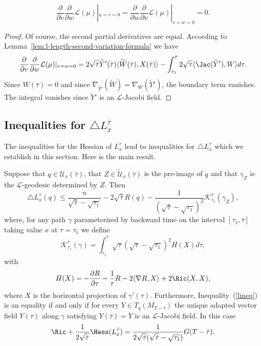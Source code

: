 \begin{claim}\label{claim:mixed-partials-vanish}
$$\frac{\partial}{\partial v}\frac{\partial}{\partial w}{\mathcal L}(\mu)|_{u=v=0}=
\frac{\partial}{\partial w}\frac{\partial}{\partial v}{\mathcal
L}(\mu)|_{v=w=0}=0.$$
\end{claim}
\begin{proof}
\sketch Of course, the second partial derivatives are equal. According to
Lemma~\ref{lem:l-length-second-variation-formula} we have
$$\frac{\partial}{\partial v}\frac{\partial}{\partial w}{\mathcal L}(\mu)|_{v=w=0}
=2\sqrt{\bar\tau} \widetilde Y'(\bar\tau)\langle \widetilde
W(\bar\tau),X(\bar\tau)\rangle-\int_{\tau_1}^{\bar\tau}2\sqrt{\tau}\langle
\Jac(\widetilde Y'),W\rangle d\tau.$$ Since $W(\bar\tau)=0$ and
since $\nabla_{\widetilde Y'}(\widetilde W)=\nabla_W(\widetilde
Y')$, the boundary term vanishes. The integral vanishes since
$\widetilde Y'$ is an ${\mathcal L}$-Jacobi field.
\end{proof}

\subsection{Inequalities for $\triangle L_x^{\bar\tau}$}

The inequalities for the Hessian of $L_x^{\bar\tau}$ lead to
inequalities for $\triangle L_x^{\bar\tau}$ which we establish in this section. Here is the
main result.


\begin{proposition}\label{prop:l-length-laplacian-inequality}
\label{triL}
Suppose that $q\in {\mathcal U}_x(\bar\tau)$, that $Z\in \widetilde
{\mathcal U}_x(\bar\tau)$ is the pre-image of $q$ and that
$\gamma_Z$ is the ${\mathcal L}$-geodesic determined by $Z$. Then
\begin{equation}\label{lineq}
 \triangle L_x^{\bar\tau}(q) \leq
\frac{n}{\sqrt{\bar\tau}-\sqrt{\tau_1}} -2\sqrt{\bar\tau}R(q) -
\frac{1}{(\sqrt{\bar\tau}-\sqrt{\tau_1})^2}{\mathcal
K}_{\tau_1}^{\bar\tau}(\gamma_Z),
\end{equation}
where, for any path $\gamma$ parameterized by backward time on the
interval
 $[\tau_1,\bar\tau]$ taking
 value $x$ at $\tau=\tau_1$ we define
$${\mathcal K}_{\tau_1}^{\bar\tau}(\gamma)= \int_{\tau_1}^{\bar\tau}
\sqrt{\tau}(\sqrt{\tau}-\sqrt{\tau_1})^2H(X)d\tau,$$ with
\begin{equation}\label{Hdefnn}
H(X)= -\frac{\partial R}{\partial \tau} - \frac{1}{\tau}R - 2\langle
\nabla R,X\rangle + 2\Ric(X,X), \end{equation} where $X$ is the
horizontal projection of $\gamma'(\tau)$. Furthermore,
Inequality~(\ref{lineq}) is an equality if and only if for every
$Y\in T_q(M_{T-\bar\tau})$ the unique adapted vector field $Y(\tau)$
along $\gamma$ satisfying $Y(\bar\tau)=Y$ is an ${\mathcal
L}$-Jacobi field. In this case
$$\Ric+\frac{1}{2\sqrt{\bar\tau}}\Hess(L_x^{\bar\tau})
=\frac{1}{2\sqrt{\bar\tau}(\sqrt{\bar\tau}-\sqrt{\tau_1})}G(T-\bar\tau).$$
\end{proposition}


